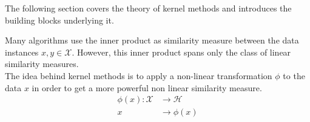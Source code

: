 The following section covers the theory of kernel methods and introduces the building blocks underlying it.


Many algorithms use the inner product as similarity measure between the data instances $x, y \in \mathcal{X}$. However, this inner product spans only the class of linear similarity measures. 
\\
The idea behind kernel methods is to apply a non-linear transformation $\phi$ to the data $x$ 
in order to get a more powerful non linear similarity measure.
\begin{align*}
\phi(x)\colon \mathcal{X} &\to \mathcal{H}
    \\
    x&\to \phi(x)
\end{align*}


